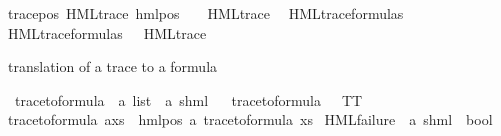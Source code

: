 \begin{isabellebody}
trace{\isacharunderscore}{\kern0pt}pos{\isacharcolon}{\kern0pt}\ {\isachardoublequoteopen}HML{\isacharunderscore}{\kern0pt}trace\ {\isacharparenleft}{\kern0pt}hml{\isacharunderscore}{\kern0pt}pos\ {\isasymalpha}\ {\isasymphi}{\isacharparenright}{\kern0pt}{\isachardoublequoteclose}\ \ {\isachardoublequoteopen}HML{\isacharunderscore}{\kern0pt}trace\ {\isasymphi}{\isachardoublequoteclose}\isanewline
\isanewline
{}\isamarkupfalse%
\ HML{\isacharunderscore}{\kern0pt}trace{\isacharunderscore}{\kern0pt}formulas\ \isanewline
{\isachardoublequoteopen}HML{\isacharunderscore}{\kern0pt}trace{\isacharunderscore}{\kern0pt}formulas\ {\isasymequiv}\ {\isacharbraceleft}{\kern0pt}{\isasymphi}{\isachardot}{\kern0pt}\ HML{\isacharunderscore}{\kern0pt}trace\ {\isasymphi}{\isacharbraceright}{\kern0pt}{\isachardoublequoteclose}%
\begin{isamarkuptext}%
translation of a trace to a formula%
\end{isamarkuptext}\isamarkuptrue%
\isamarkupfalse%
\ trace{\isacharunderscore}{\kern0pt}to{\isacharunderscore}{\kern0pt}formula\ {\isacharcolon}{\kern0pt}{\isacharcolon}{\kern0pt}\ {\isachardoublequoteopen}{\isacharprime}{\kern0pt}a\ list\ {\isasymRightarrow}\ {\isacharparenleft}{\kern0pt}{\isacharprime}{\kern0pt}a{\isacharcomma}{\kern0pt}\ {\isacharprime}{\kern0pt}s{\isacharparenright}{\kern0pt}hml{\isachardoublequoteclose}\isanewline
\ \ \isanewline
{\isachardoublequoteopen}trace{\isacharunderscore}{\kern0pt}to{\isacharunderscore}{\kern0pt}formula\ {\isacharbrackleft}{\kern0pt}{\isacharbrackright}{\kern0pt}\ {\isacharequal}{\kern0pt}\ TT{\isachardoublequoteclose}\ {\isacharbar}{\kern0pt}\isanewline
{\isachardoublequoteopen}trace{\isacharunderscore}{\kern0pt}to{\isacharunderscore}{\kern0pt}formula\ {\isacharparenleft}{\kern0pt}a{\isacharhash}{\kern0pt}xs{\isacharparenright}{\kern0pt}\ {\isacharequal}{\kern0pt}\ hml{\isacharunderscore}{\kern0pt}pos\ a\ {\isacharparenleft}{\kern0pt}trace{\isacharunderscore}{\kern0pt}to{\isacharunderscore}{\kern0pt}formula\ xs{\isacharparenright}{\kern0pt}{\isachardoublequoteclose}\isanewline
\isanewline
{}\isamarkupfalse%
\ HML{\isacharunderscore}{\kern0pt}failure\ {\isacharcolon}{\kern0pt}{\isacharcolon}{\kern0pt}\ {\isachardoublequoteopen}{\isacharparenleft}{\kern0pt}{\isacharprime}{\kern0pt}a{\isacharcomma}{\kern0pt}\ {\isacharprime}{\kern0pt}s{\isacharparenright}{\kern0pt}hml\ {\isasymRightarrow}\ bool{\isachardoublequoteclose}\isanewline
\ \ \isanewline

\end{isabellebody}
